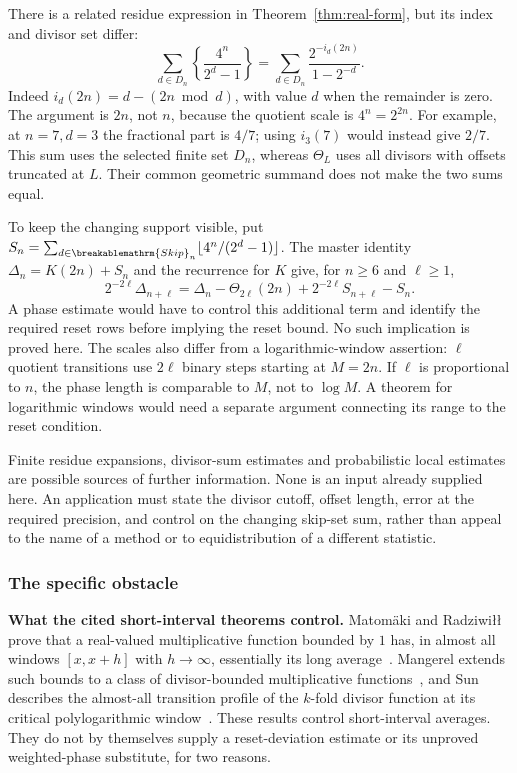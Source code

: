 \documentclass[11pt]{article}
\theoremstyle{plain}
\theoremstyle{definition}
\theoremstyle{remark}
\renewcommand{\mathrm}[1]{\ifmmode\breakablemathrm{#1}\else\textrm{#1}\fi}%
\begin{document}
There is a related residue expression in
Theorem~\ref{thm:real-form}, but its index and divisor set differ:
\[
 \sum_{d\in D_n}\left\{\frac{4^n}{2^d-1}\right\}
 =\sum_{d\in D_n}\frac{2^{-i_d(2n)}}{1-2^{-d}}.
\]
Indeed $i_d(2n)=d-(2n\bmod d)$, with value $d$ when the
remainder is zero.  The argument is $2n$, not $n$, because the
quotient scale is $4^n=2^{2n}$.  For example, at $n=7,d=3$ the
fractional part is $4/7$; using $i_3(7)$ would instead give $2/7$.
This sum uses the selected finite set $D_n$, whereas $\Theta_L$
uses all divisors with offsets truncated at $L$.  Their common
geometric summand does not make the two sums equal.

To keep the changing support visible, put
$S_n=\sum_{d\in\mathrm{Skip}_n}\lfloor4^n/(2^d-1)\rfloor$.
The master identity $\Delta_n=K(2n)+S_n$ and the recurrence for $K$
give, for $n\ge6$ and $\ell\ge1$,
\[
 2^{-2\ell}\Delta_{n+\ell}
 =\Delta_n-\Theta_{2\ell}(2n)
       +2^{-2\ell}S_{n+\ell}-S_n.
\]
A phase estimate would have to control this additional term and
identify the required reset rows before implying the reset bound.
No such implication is proved here.  The scales also differ from
a logarithmic-window assertion: $\ell$ quotient transitions use
$2\ell$ binary steps starting at $M=2n$.  If $\ell$ is proportional
to $n$, the phase length is comparable to $M$, not to $\log M$.
A theorem for logarithmic windows would need a separate argument
connecting its range to the reset condition.

Finite residue expansions, divisor-sum estimates and probabilistic
local estimates are possible sources of further information.  None
is an input already supplied here.  An application must state the
divisor cutoff, offset length, error at the required precision, and
control on the changing skip-set sum, rather than appeal to the
name of a method or to equidistribution of a different statistic.

\subsubsection*{The specific obstacle}

\textbf{What the cited short-interval theorems control.}  Matom\"aki and
Radziwi\l{}\l{} prove that a real-valued multiplicative function bounded by $1$ has, in almost all
windows $[x,x+h]$ with $h\to\infty$, essentially its long
average~\cite[Theorem~1, pp.~1--2]{matomakiradziwill}.  Mangerel extends such bounds to a class of
divisor-bounded multiplicative
functions~\cite[Theorem~1.7, p.~7, and Corollary~1.8, pp.~7--8]{mangerel2021}, and Sun describes the
almost-all transition profile of the $k$-fold divisor function at its critical polylogarithmic
window~\cite[Theorem~1.1 and Corollary~1.2, p.~3]{sun2026}.  These results control short-interval averages.  They do not by
themselves supply a reset-deviation estimate or its unproved
weighted-phase substitute, for two reasons.
\end{document}
